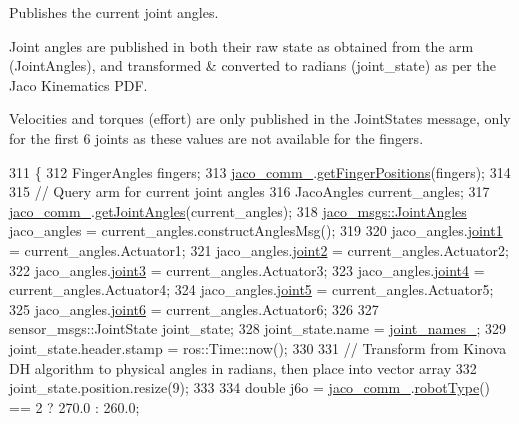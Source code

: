 Publishes the current joint angles. 

Joint angles are published in both their raw state as obtained from the arm (Joint\+Angles), and transformed \& converted to radians (joint\+\_\+state) as per the Jaco Kinematics P\+DF.

Velocities and torques (effort) are only published in the Joint\+States message, only for the first 6 joints as these values are not available for the fingers. 
\begin{DoxyCode}
311 \{
312     FingerAngles fingers;
313     \hyperlink{classjaco_1_1JacoArm_a2f9cbba855994058b82c0f4628349286}{jaco\_comm\_}.\hyperlink{classjaco_1_1JacoComm_a7644bf1154b59bf4d8b97c200284e3fb}{getFingerPositions}(fingers);
314 
315     \textcolor{comment}{// Query arm for current joint angles}
316     JacoAngles current\_angles;
317     \hyperlink{classjaco_1_1JacoArm_a2f9cbba855994058b82c0f4628349286}{jaco\_comm\_}.\hyperlink{classjaco_1_1JacoComm_a5fcb23bf6925a82f2ab5e42460ea3834}{getJointAngles}(current\_angles);
318     \hyperlink{structjaco__msgs_1_1JointAngles__}{jaco\_msgs::JointAngles} jaco\_angles = current\_angles.constructAnglesMsg();
319 
320     jaco\_angles.\hyperlink{structjaco__msgs_1_1JointAngles___a5ebadd874f74af99d452dc42787489b7}{joint1} = current\_angles.Actuator1;
321     jaco\_angles.\hyperlink{structjaco__msgs_1_1JointAngles___ad7bfb312caeafc6b2cb1fc02c6a3e116}{joint2} = current\_angles.Actuator2;
322     jaco\_angles.\hyperlink{structjaco__msgs_1_1JointAngles___ae8e5d407b34f0a6acd368ec1a28df526}{joint3} = current\_angles.Actuator3;
323     jaco\_angles.\hyperlink{structjaco__msgs_1_1JointAngles___accb31f45f3a313794a9cab57b8a9b952}{joint4} = current\_angles.Actuator4;
324     jaco\_angles.\hyperlink{structjaco__msgs_1_1JointAngles___ad02e456e0b382b2bf59b4eeb93318921}{joint5} = current\_angles.Actuator5;
325     jaco\_angles.\hyperlink{structjaco__msgs_1_1JointAngles___a474d9f2a0e329ba6bd08c8fa265e9a50}{joint6} = current\_angles.Actuator6;
326 
327     sensor\_msgs::JointState joint\_state;
328     joint\_state.name = \hyperlink{classjaco_1_1JacoArm_a9a6611a10119b2651aa96eb21ecd10ad}{joint\_names\_};
329     joint\_state.header.stamp = ros::Time::now();
330 
331     \textcolor{comment}{// Transform from Kinova DH algorithm to physical angles in radians, then place into vector array}
332     joint\_state.position.resize(9);
333 
334     \textcolor{keywordtype}{double} j6o = \hyperlink{classjaco_1_1JacoArm_a2f9cbba855994058b82c0f4628349286}{jaco\_comm\_}.\hyperlink{classjaco_1_1JacoComm_af20323ed50f73b59bac3e18ebd8559fa}{robotType}() == 2 ? 270.0 : 260.0;

\end{DoxyCode}
